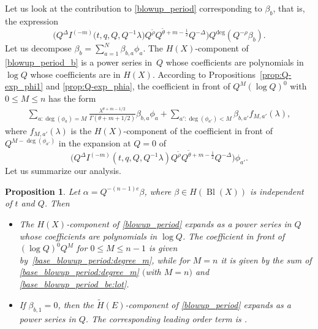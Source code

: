 \documentclass[pdftex]{sigma}
\numberwithin{equation}{section}
\newtheorem{Proposition}[Theorem]{Proposition}
\newcommand{\leftexp}[2]{{\vphantom{#2}}^{#1}{#2}}
\begin{document}
Let us look at the contribution to \eqref{blowup_period} corresponding to $\beta_b$, that is, the expression
\begin{equation}\label{blowup_period_b}
\big(Q^\Delta I^{(-m)}\big(t,q,Q,Q^{-1}\lambda\big)Q^{\widetilde\rho}Q^{\widetilde\theta+m-\frac{1}{2}}Q^{-\Delta}\big)
 Q^{\operatorname{deg}} (Q^{-\rho} \beta_b).
\end{equation}
Let us decompose $\beta_b=\sum_{a=1}^N \beta_{b,a} \phi_a$. The $H(X)$-component of \eqref{blowup_period_b} is a power series in~$Q$ whose coefficients are polynomials in $\log Q$ whose coefficients are in $H(X)$. According to Propositions~\eqref{prop:Q-exp_phi1} and
\eqref{prop:Q-exp_phia}, the coefficient in front of $Q^M (\log Q)^0$ with $0\leq M\leq n$ has the form
\begin{gather}\label{base_blowup_period:degree_m}
\sum_{a\colon \operatorname{deg}(\phi_a)=M}
\frac{\lambda^{\theta+m-1/2}}{\Gamma(\theta+m+1/2)} \beta_{b,a}\phi_a +
\sum_{a'\colon \operatorname{deg}(\phi_{a'})<M} \beta_{b,a'} f_{M,a'}(\lambda),
\end{gather}
where $f_{M,a'}(\lambda)$ is the $H(X)$-component of the coefficient in front of $Q^{M-\operatorname{deg}(\phi_{a'})}$ in the expansion at $Q=0$ of
\[
\big(Q^\Delta I^{(-m)}\left(t,q,Q,Q^{-1}\lambda\right)Q^{\widetilde\rho}Q^{\widetilde\theta+m-\frac{1}{2}}Q^{-\Delta}\big)
 \phi_{a'}.
\]
Let us summarize our analysis.
\begin{Proposition}\label{prop:blowup_period_Qexp}
Let $\alpha=Q^{-(n-1)e}\beta$, where $\beta\in H(\operatorname{Bl}(X))$ is independent of $t$ and $Q$. Then
\begin{itemize}\itemsep=0pt
\item[$(a)$] The $H(X)$-component of \eqref{blowup_period} expands as a power series in $Q$ whose coefficients are polynomials in $\log Q$. The coefficient in front of $(\log Q)^0 Q^M$ for $0\leq M\leq n-1$ is given by~\eqref{base_blowup_period:degree_m}, while for $M=n$ it is given by the sum of \eqref{base_blowup_period:degree_m} $($with $M=n)$ and \eqref{base_blowup_period_be:lot}.
\item[$(b)$] If $\beta_{b,1}=0$, then the $\widetilde{H}(E)$-component of \eqref{blowup_period} expands as a power series in $Q$. The corresponding leading order term is \smash{$\leftexp{tw}{I}_{\beta_e}^{(-m)}(1,\lambda)$}.
\end{itemize}
\end{Proposition}
\end{document}
